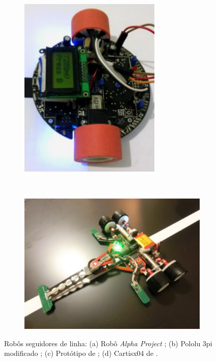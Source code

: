 \begin{figure}[h]
    \begin{subfigure}[b]{0.4\textwidth}
	\centering
        \includegraphics[width=0.75\textwidth,height=0.18\textheight]{figuras/polulumod.png}
        \caption{\centering \label{fig:pololu}}
    \end{subfigure}
    ~ %
    \begin{subfigure}[b]{0.4\textwidth}
        \includegraphics[width=\textwidth,height=0.18\textheight]{figuras/Hirai.png}
        \caption{\centering \label{fig:hirai}}
    \end{subfigure}
    
    \caption{\label{fig:segLinha} Robôs seguidores de linha: (a) Robô \textit{Alpha Project} \cite{alemao}; 
    (b) Pololu 3pi modificado \cite{alemao}; (c) Protótipo de ; (d) Cartisx04 de .}
\end{figure}




